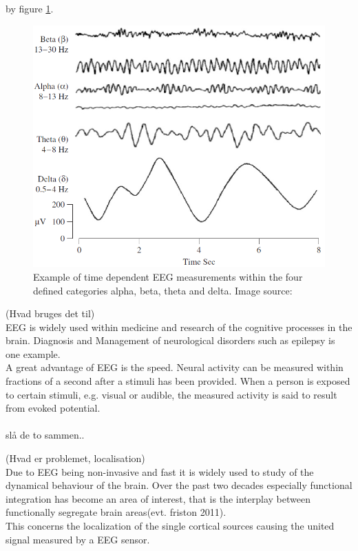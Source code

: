 by figure \ref{fig:EEG_example}.        
\begin{figure}[h]
    \centering
    \includegraphics[scale=0.65]{figurs/EEG_example.png}
    \caption{Example of time dependent EEG measurements within the four defined categories alpha, beta, theta and delta. Image source: \cite{EEGsignalprocessing}}
    \label{fig:EEG_example}
\end{figure}

(Hvad bruges det til)\\
EEG is widely used within medicine and research of the cognitive processes in the brain. Diagnosis and Management of neurological disorders such as epilepsy is one example. \\   
A great advantage of EEG is the speed. Neural activity can be measured within fractions of a second after a stimuli has been provided\cite[p. 3]{fundamentalEEG}. When a person is exposed to certain stimuli, e.g. visual or audible, the measured activity is said to result from evoked potential.\\
\\
slå de to sammen..

(Hvad er problemet, localisation)\\
Due to EEG being non-invasive and fast it is widely used to study of the dynamical behaviour of the brain. Over the past two decades especially functional integration has become an area of interest, that is the interplay between functionally segregate brain areas\cite{Van2019}(evt. friston 2011).  \\
This concerns the localization of the single cortical sources causing the united signal measured by a EEG sensor.\\ 
\\  


